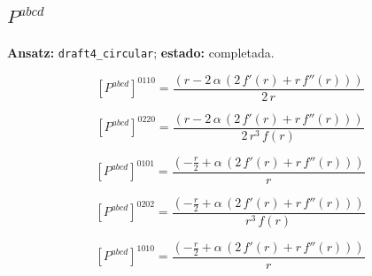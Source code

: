 \documentclass[11pt]{article}
\begin{document}
\subsection*{$ P^{abcd} $}
\textbf{Ansatz:} \texttt{draft4\_circular}; \textbf{estado:} completada.\par
\begin{dmath*}[breakdepth={5}]
\left[P^{abcd}\right]^{0110} = \frac{\left(r - 2\,\alpha\,\left(2\,f'\!\left(r\right) + r\,f''\!\left(r\right)\right)\right)}{2\,r}
\end{dmath*}
\par\smallskip
\begin{dmath*}[breakdepth={5}]
\left[P^{abcd}\right]^{0220} = \frac{\left(r - 2\,\alpha\,\left(2\,f'\!\left(r\right) + r\,f''\!\left(r\right)\right)\right)}{2\,{r}^{3}\,f\!\left(r\right)}
\end{dmath*}
\par\smallskip
\begin{dmath*}[breakdepth={5}]
\left[P^{abcd}\right]^{0101} = \frac{\left(-\frac{r}{2} + \alpha\,\left(2\,f'\!\left(r\right) + r\,f''\!\left(r\right)\right)\right)}{r}
\end{dmath*}
\par\smallskip
\begin{dmath*}[breakdepth={5}]
\left[P^{abcd}\right]^{0202} = \frac{\left(-\frac{r}{2} + \alpha\,\left(2\,f'\!\left(r\right) + r\,f''\!\left(r\right)\right)\right)}{{r}^{3}\,f\!\left(r\right)}
\end{dmath*}
\par\smallskip
\begin{dmath*}[breakdepth={5}]
\left[P^{abcd}\right]^{1010} = \frac{\left(-\frac{r}{2} + \alpha\,\left(2\,f'\!\left(r\right) + r\,f''\!\left(r\right)\right)\right)}{r}
\end{dmath*}
\end{document}
